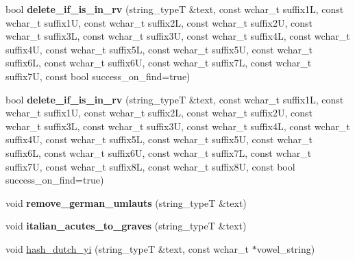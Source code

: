 \begin{DoxyCompactItemize}
\item 
\hypertarget{classstemming_1_1stem_acc427221d55bf93e113f2811eedca74a}{bool {\bfseries delete\+\_\+if\+\_\+is\+\_\+in\+\_\+rv} (string\+\_\+type\+T \&text, const wchar\+\_\+t suffix1\+L, const wchar\+\_\+t suffix1\+U, const wchar\+\_\+t suffix2\+L, const wchar\+\_\+t suffix2\+U, const wchar\+\_\+t suffix3\+L, const wchar\+\_\+t suffix3\+U, const wchar\+\_\+t suffix4\+L, const wchar\+\_\+t suffix4\+U, const wchar\+\_\+t suffix5\+L, const wchar\+\_\+t suffix5\+U, const wchar\+\_\+t suffix6\+L, const wchar\+\_\+t suffix6\+U, const wchar\+\_\+t suffix7\+L, const wchar\+\_\+t suffix7\+U, const bool success\+\_\+on\+\_\+find=true)}\label{classstemming_1_1stem_acc427221d55bf93e113f2811eedca74a}

\item 
\hypertarget{classstemming_1_1stem_ab0b50197480905de68f3be29714860d7}{bool {\bfseries delete\+\_\+if\+\_\+is\+\_\+in\+\_\+rv} (string\+\_\+type\+T \&text, const wchar\+\_\+t suffix1\+L, const wchar\+\_\+t suffix1\+U, const wchar\+\_\+t suffix2\+L, const wchar\+\_\+t suffix2\+U, const wchar\+\_\+t suffix3\+L, const wchar\+\_\+t suffix3\+U, const wchar\+\_\+t suffix4\+L, const wchar\+\_\+t suffix4\+U, const wchar\+\_\+t suffix5\+L, const wchar\+\_\+t suffix5\+U, const wchar\+\_\+t suffix6\+L, const wchar\+\_\+t suffix6\+U, const wchar\+\_\+t suffix7\+L, const wchar\+\_\+t suffix7\+U, const wchar\+\_\+t suffix8\+L, const wchar\+\_\+t suffix8\+U, const bool success\+\_\+on\+\_\+find=true)}\label{classstemming_1_1stem_ab0b50197480905de68f3be29714860d7}

\item 
\hypertarget{classstemming_1_1stem_a760765796790f28c1acfa3b1e603781d}{void {\bfseries remove\+\_\+german\+\_\+umlauts} (string\+\_\+type\+T \&text)}\label{classstemming_1_1stem_a760765796790f28c1acfa3b1e603781d}

\item 
\hypertarget{classstemming_1_1stem_a85e349feabc837fa38ceb40cbfe8f16e}{void {\bfseries italian\+\_\+acutes\+\_\+to\+\_\+graves} (string\+\_\+type\+T \&text)}\label{classstemming_1_1stem_a85e349feabc837fa38ceb40cbfe8f16e}

\item 
\hypertarget{classstemming_1_1stem_ad7324f61a80140d122da1c087289b737}{void \hyperlink{classstemming_1_1stem_ad7324f61a80140d122da1c087289b737}{hash\+\_\+dutch\+\_\+yi} (string\+\_\+type\+T \&text, const wchar\+\_\+t $\ast$vowel\+\_\+string)}\label{classstemming_1_1stem_ad7324f61a80140d122da1c087289b737}


\end{DoxyCompactItemize}
